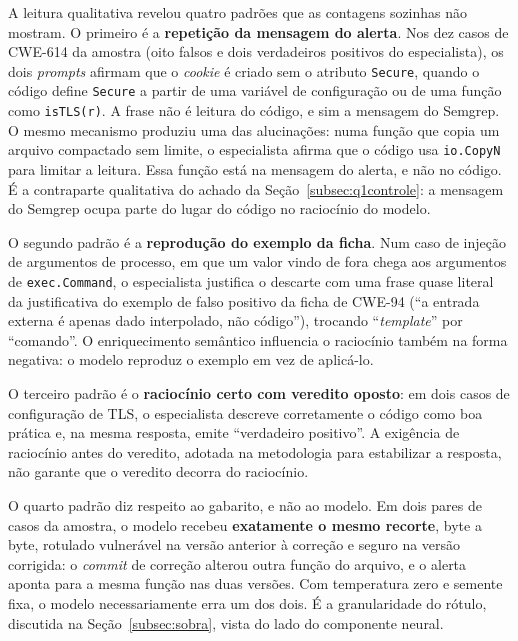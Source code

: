 A leitura qualitativa revelou quatro padrões que as contagens sozinhas não mostram. O primeiro é a \textbf{repetição da mensagem do alerta}. Nos dez casos de CWE-614 da amostra (oito falsos e dois verdadeiros positivos do especialista), os dois \textit{prompts} afirmam que o \textit{cookie} é criado sem o atributo \texttt{Secure}, quando o código define \texttt{Secure} a partir de uma variável de configuração ou de uma função como \texttt{isTLS(r)}. A frase não é leitura do código, e sim a mensagem do Semgrep. O mesmo mecanismo produziu uma das alucinações: numa função que copia um arquivo compactado sem limite, o especialista afirma que o código usa \texttt{io.CopyN} para limitar a leitura. Essa função está na mensagem do alerta, e não no código. É a contraparte qualitativa do achado da Seção~\ref{subsec:q1controle}: a mensagem do Semgrep ocupa parte do lugar do código no raciocínio do modelo.

O segundo padrão é a \textbf{reprodução do exemplo da ficha}. Num caso de injeção de argumentos de processo, em que um valor vindo de fora chega aos argumentos de \texttt{exec.Command}, o especialista justifica o descarte com uma frase quase literal da justificativa do exemplo de falso positivo da ficha de CWE-94 (``a entrada externa é apenas dado interpolado, não código''), trocando ``\textit{template}'' por ``comando''. O enriquecimento semântico influencia o raciocínio também na forma negativa: o modelo reproduz o exemplo em vez de aplicá-lo.

O terceiro padrão é o \textbf{raciocínio certo com veredito oposto}: em dois casos de configuração de TLS, o especialista descreve corretamente o código como boa prática e, na mesma resposta, emite ``verdadeiro positivo''. A exigência de raciocínio antes do veredito, adotada na metodologia para estabilizar a resposta, não garante que o veredito decorra do raciocínio.

O quarto padrão diz respeito ao gabarito, e não ao modelo. Em dois pares de casos da amostra, o modelo recebeu \textbf{exatamente o mesmo recorte}, byte a byte, rotulado vulnerável na versão anterior à correção e seguro na versão corrigida: o \textit{commit} de correção alterou outra função do arquivo, e o alerta aponta para a mesma função nas duas versões. Com temperatura zero e semente fixa, o modelo necessariamente erra um dos dois. É a granularidade do rótulo, discutida na Seção~\ref{subsec:sobra}, vista do lado do componente neural.

